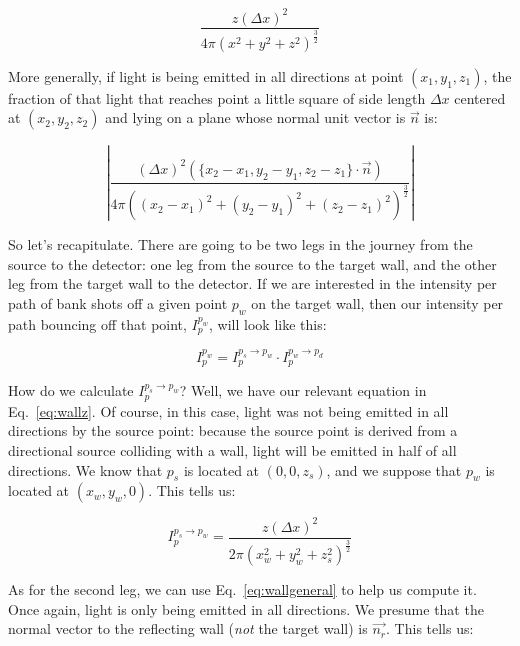 \documentclass[11pt]{article}
\begin{document}
\begin{equation}
\frac{z (\Delta x)^2}{4\pi(x^2 + y^2 + z^2)^{\frac{3}{2}}}
\label{eq:wallz}
\end{equation}

More generally, if light is being emitted in all directions at point $(x_1, y_1, z_1)$, the fraction of that light that reaches point a little square of side length $\Delta x$ centered at $(x_2,y_2,z_2)$ and lying on a plane whose normal unit vector is $\vec{n}$ is:

\begin{equation}
    \left|\frac{(\Delta x)^2 (\{x_2-x_1, y_2-y_1, z_2-z_1\} \cdot \vec{n})}{4 \pi ((x_2-x_1)^2 + (y_2-y_1)^2 + (z_2-z_1)^2)^{\frac{3}{2}}}\right|
    \label{eq:wallgeneral}
\end{equation}

So let's recapitulate. There are going to be two legs in the journey from the source to the detector: one leg from the source to the target wall, and the other leg from the target wall to the detector. If we are interested in the intensity per path of bank shots off a given point $p_w$ on the target wall, then our intensity per path bouncing off that point, $I_p^{p_w}$, will look like this:

\begin{equation}
    I_p^{p_w} = I_p^{p_s \rightarrow p_w} \cdot I_p^{p_w \rightarrow p_d}
    \label{eq:intensityatpoint}
\end{equation}

How do we calculate $I_p^{p_s \rightarrow p_w}$? Well, we have our relevant equation in Eq.~\ref{eq:wallz}. Of course, in this case, light was not being emitted in all directions by the source point: because the source point is derived from a directional source colliding with a wall, light will be emitted in half of all directions. We know that $p_s$ is located at $(0, 0, z_s)$, and we suppose that $p_w$ is located at $(x_w, y_w, 0)$. This tells us:

\begin{equation}
    I_p^{p_s \rightarrow p_w} = \frac{z (\Delta x)^2}{2\pi(x_w^2 + y_w^2 + z_s^2)^{\frac{3}{2}}} 
    \label{eq:firstleg}
\end{equation}

As for the second leg, we can use Eq.~\ref{eq:wallgeneral} to help us compute it. Once again, light is only being emitted in all directions. We presume that the normal vector to the reflecting wall (\emph{not} the target wall) is $\vec{n_r}$. This tells us:
\end{document}
